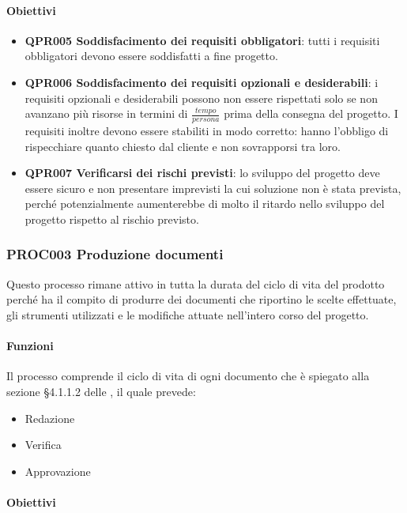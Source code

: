 		\paragraph*{Obiettivi}
		
		\begin{itemize}
			\item \textbf{QPR005 Soddisfacimento dei requisiti obbligatori}: tutti i requisiti obbligatori devono essere soddisfatti a fine progetto.
			\item \textbf{QPR006 Soddisfacimento dei requisiti opzionali e desiderabili}: i requisiti opzionali e desiderabili possono non essere rispettati solo se non avanzano più risorse in termini di $ \frac{tempo}{persona} $ prima della consegna del progetto. I requisiti inoltre devono essere stabiliti in modo corretto: hanno l'obbligo di rispecchiare quanto chiesto dal cliente e non sovrapporsi tra loro.
			\item \textbf{QPR007 Verificarsi dei rischi previsti}: lo sviluppo del progetto deve essere sicuro e non presentare imprevisti la cui soluzione non è stata prevista, perché potenzialmente aumenterebbe di molto il ritardo nello sviluppo del progetto rispetto al rischio previsto.
		\end{itemize}
	
	\subsubsection{PROC003 Produzione documenti}
	Questo processo rimane attivo in tutta la durata del ciclo di vita del prodotto perché ha il compito di produrre dei documenti che riportino le scelte effettuate, gli strumenti utilizzati e le modifiche attuate nell'intero corso del progetto.
	
		\paragraph*{Funzioni}
		Il processo comprende il ciclo di vita di ogni documento che è spiegato alla sezione §4.1.1.2 delle \NdP, il quale prevede:
		
		\begin{itemize}
			\item Redazione
			\item Verifica
			\item Approvazione
		\end{itemize}
	
		\paragraph*{Obiettivi}
		
